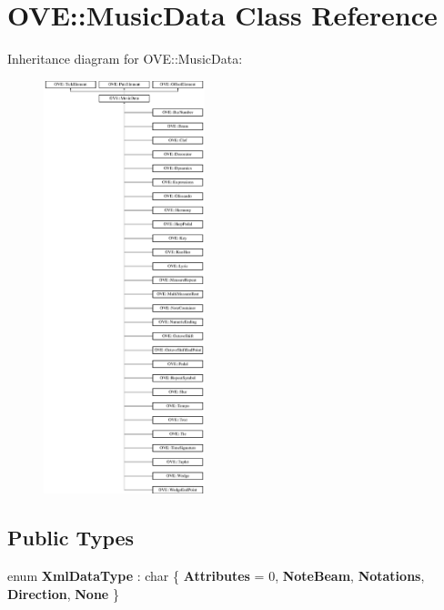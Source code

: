 \hypertarget{class_o_v_e_1_1_music_data}{}\section{O\+VE\+:\+:Music\+Data Class Reference}
\label{class_o_v_e_1_1_music_data}
Inheritance diagram for O\+VE\+:\+:Music\+Data\+:\begin{figure}[H]
\begin{center}
\leavevmode
\includegraphics[height=12.000000cm]{class_o_v_e_1_1_music_data}
\end{center}
\end{figure}
\subsection*{Public Types}
\begin{DoxyCompactItemize}
\item 
\mbox{\label{class_o_v_e_1_1_music_data_a4beb6a8896ff957a50bae0ad90f73247}} 
enum {\bfseries Xml\+Data\+Type} \+: char \{ \newline
{\bfseries Attributes} = 0, 
{\bfseries Note\+Beam}, 
{\bfseries Notations}, 
{\bfseries Direction}, 
\newline
{\bfseries None}
 \}
\end{DoxyCompactItemize}
